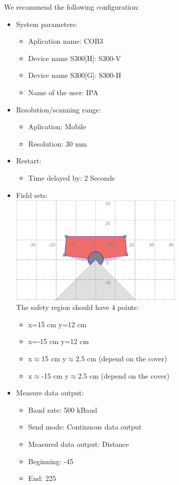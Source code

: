 We recommend the following configuration:
\begin{itemize}
\item System parameters:
\begin{itemize}
\item Aplication name: COB3
\item Device name S300[H]: S300-V
\item Device name S300[G]: S300-H
\item Name of the user: IPA
\end{itemize}
\item Resolution/scanning range:
\begin{itemize}
\item Aplication: Mobile
\item Resolution: 30 mm
\end{itemize}
\item Restart:
\begin{itemize}
\item Time delayed by: 2 Seconds
\end{itemize}
\item Field sets:
\\
\includegraphics[width=0.65\textwidth]{images/area.png}
\\ The safety region should have 4 points:
\begin{itemize}
\item x=15 cm y=12 cm
\item x=-15 cm y=12 cm
\item x$\approx$15 cm y$\approx$2.5 cm (depend on the cover)
\item x$\approx$-15 cm y$\approx$2.5 cm (depend on the cover)
\end{itemize}
\item Measure data output:
\begin{itemize}
\item Baud rate: 500 kBaud
\item Send mode: Continuous data output
\item Measured data output: Distance
\item Beginning: -45
\item End: 225
\end{itemize}
\end{itemize}

